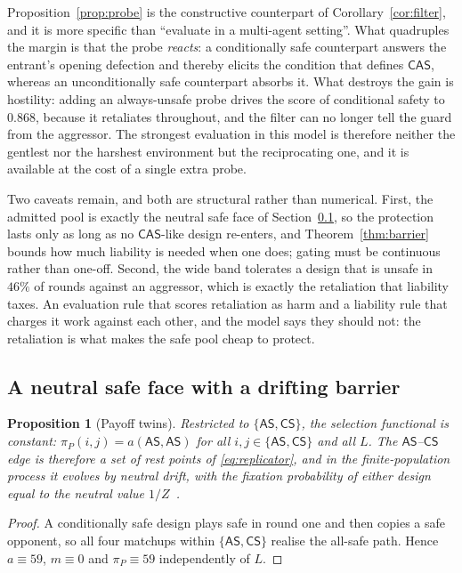 \documentclass[pdflatex]{sn-jnl}
\theoremstyle{thmstyleone}
\newtheorem{proposition}[theorem]{Proposition}
\theoremstyle{thmstylethree}
\theoremstyle{thmstyletwo}
\newcommand{\AS}{\textsf{AS}}
\newcommand{\CS}{\textsf{CS}}
\newcommand{\CAS}{\textsf{CAS}}
\newcommand{\piP}{\pi_{P}}
\begin{document}
Proposition~\ref{prop:probe} is the constructive counterpart of
Corollary~\ref{cor:filter}, and it is more specific than ``evaluate in a
multi-agent setting''. What quadruples the margin is that the probe
\emph{reacts}: a conditionally safe counterpart answers the entrant's opening
defection and thereby elicits the condition that defines $\CAS$, whereas an
unconditionally safe counterpart absorbs it. What destroys the gain is
hostility: adding an always-unsafe probe drives the score of conditional
safety to $0.868$, because it retaliates throughout, and the filter can no
longer tell the guard from the aggressor. The strongest evaluation in this
model is therefore neither the gentlest nor the harshest environment but the
reciprocating one, and it is available at the cost of a single extra probe.

Two caveats remain, and both are structural rather than numerical. First, the
admitted pool is exactly the neutral safe face of Section~\ref{sec:face}, so
the protection lasts only as long as no $\CAS$-like design re-enters, and
Theorem~\ref{thm:barrier} bounds how much liability is needed when one does;
gating must be continuous rather than one-off. Second, the wide band tolerates
a design that is unsafe in $46\%$ of rounds against an aggressor, which is
exactly the retaliation that liability taxes. An evaluation rule that scores
retaliation as harm and a liability rule that charges it work against each
other, and the model says they should not: the retaliation is what makes the
safe pool cheap to protect.

\subsection{A neutral safe face with a drifting barrier}\label{sec:face}

\begin{proposition}[Payoff twins]\label{prop:twins}
Restricted to $\{\AS,\CS\}$, the selection functional is constant:
$\piP(i,j)=a(\AS,\AS)$ for all $i,j\in\{\AS,\CS\}$ and all $L$. The
$\AS$--$\CS$ edge is therefore a set of rest points of
\eqref{eq:replicator}, and in the finite-population process it evolves by
neutral drift, with the fixation probability of either design equal to the
neutral value $1/Z$~\citep{nowak2004emergence}.
\end{proposition}

\begin{proof}
A conditionally safe design plays safe in round one and then copies a safe
opponent, so all four matchups within $\{\AS,\CS\}$ realise the all-safe path.
Hence $a\equiv 59$, $m\equiv 0$ and $\piP\equiv 59$ independently of $L$.
\end{proof}
\end{document}
